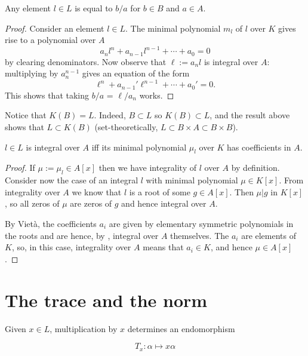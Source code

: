 \documentclass{memoir}
\begin{document}
\begin{theorem}
  Any element $l \in L$ is equal to $b/a$ for $b \in B$ and $a \in A$.
\end{theorem}

\begin{proof}
  Consider an element $l \in L$. The minimal polynomial $m_l$ of $l$ over $K$
  gives rise to a polynomial over $A$
  \[ a_nl^n + a_{n-1}l^{n-1} + \cdots + a_0 = 0 \] by clearing denominators. Now
  observe that $\ell := a_nl$ is integral over $A$: multiplying by $a_n^{n-1}$
  gives an equation of the form
  \[ \ell^n + a_{n-1}'\ell^{n-1} + \cdots + a_0' = 0. \] This shows that taking
  $b/a$ = $\ell/a_n$ works.
\end{proof}

\begin{remark}
  Notice that $K(B) = L$. Indeed, $B \subset L$ so $K(B) \subset L$, and the
  result above shows that $L \subset K(B)$ (set-theoretically, $L \subset B
  \times A \subset B \times B$).
\end{remark}

\begin{theorem}
  $l \in L$ is integral over $A$ iff its minimal polynomial $\mu_l$ over $K$ has
  coefficients in $A$.
\end{theorem}

\begin{proof}
  If $\mu := \mu_l \in A[x]$ then we have integrality of $l$ over $A$ by
  definition. Consider now the case of an integral $l$ with minimal polynomial
  $\mu \in K[x]$. From integrality over $A$ we know that $l$ is a root of some
  $g \in A[x]$. Then $\mu | g$ in $K[x]$, so all zeros of $\mu$ are zeros of $g$
  and hence integral over $A$.

  \npar By Viet\`a, the coefficients $a_i$ are given by elementary symmetric
  polynomials in the roots and are hence, by
  , integral over $A$ themselves. The $a_i$
  are elements of $K$, so, in this case, integrality over $A$ means that $a_i
  \in K$, and hence $\mu \in A[x]$.
\end{proof}

\section{The trace and the norm}

Given $x \in L$, multiplication by $x$ determines an endomorphism

\[ T_x : \alpha \mapsto x\alpha \]
\end{document}
